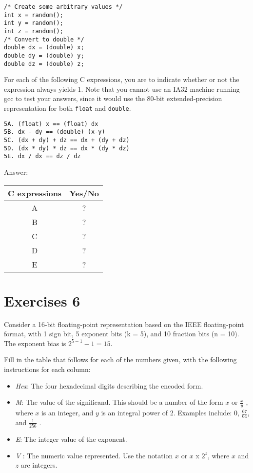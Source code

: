 \documentclass[a4paper]{article}
\begin{document}
\begin{verbatim}
/* Create some arbitrary values */
int x = random();
int y = random();
int z = random();
/* Convert to double */
double dx = (double) x;
double dy = (double) y;
double dz = (double) z;
\end{verbatim}

For each of the following C expressions, you are to indicate whether or not the expression always yields 1. Note that you cannot use an IA32 machine running gcc to test your answers, since it would use the 80-bit extended-precision representation for both \texttt{float} and \texttt{double}.

\begin{verbatim}
5A. (float) x == (float) dx
5B. dx - dy == (double) (x-y)
5C. (dx + dy) + dz == dx + (dy + dz)
5D. (dx * dy) * dz == dx * (dy * dz)
5E. dx / dx == dz / dz
\end{verbatim}

Answer: %

\begin{table}[ht]
\begin{tabular}{|c|c|}
\hline
C expressions&Yes/No\\
\hline
A & ? \\
\hline
B & ? \\
\hline
C & ? \\
\hline
D & ? \\
\hline
E & ? \\
\hline
\end{tabular}
\end{table}

\section{Exercises 6}
Consider a 16-bit floating-point representation based on the IEEE floating-point format, with 1 sign bit, 5 exponent bits (k = 5), and 10 fraction bits (n = 10). The exponent bias is $2^{5-1} - 1= 15$.

Fill in the table that follows for each of the numbers given, with the following instructions for each column:
\begin{itemize}
\item \textit{Hex}: The four hexadecimal digits describing the encoded form.
\item \textit{M}: The value of the significand. This should be a number of the form $x$ or $\frac{x}{y}$ , where $x$ is an integer, and $y$ is an integral power of 2. Examples include: 0, $\frac{67}{64}$, and $\frac{1}{256}$ .
\item \textit{E}: The integer value of the exponent.
\item \textit{V} : The numeric value represented. Use the notation $x$ or
$x$ x $2^z$, where $x$ and $z$ are integers.
\end{itemize}
\end{document}
